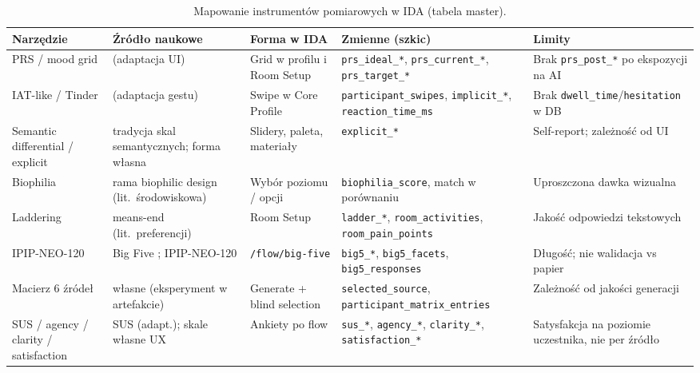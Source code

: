 \begin{table}[htbp]
  \centering
  \small
  \caption{Mapowanie instrumentów pomiarowych w IDA (tabela master).}
  \label{tab:ch06:instruments}
  \begin{tabular}{@{}p{2.2cm}p{2.6cm}p{3.0cm}p{2.8cm}p{2.8cm}@{}}
    \toprule
    Narzędzie & Źródło naukowe & Forma w IDA & Zmienne (szkic) & Limity \\
    \midrule
    PRS / mood grid &
      \textcite{hartig1997prs} (adaptacja UI) &
      Grid w profilu i Room Setup &
      \texttt{prs\_ideal\_*}, \texttt{prs\_current\_*}, \texttt{prs\_target\_*} &
      Brak \texttt{prs\_post\_*} po ekspozycji na AI \\
    \addlinespace
    IAT-like / Tinder &
      \textcite{greenwald1998iat} (adaptacja gestu) &
      Swipe w Core Profile &
      \texttt{participant\_swipes}, \texttt{implicit\_*}, \texttt{reaction\_time\_ms} &
      Brak \texttt{dwell\_time}/\texttt{hesitation} w DB \\
    \addlinespace
    Semantic differential / explicit &
      tradycja skal semantycznych; forma własna &
      Slidery, paleta, materiały &
      \texttt{explicit\_*} &
      Self-report; zależność od UI \\
    \addlinespace
    Biophilia &
      rama biophilic design (lit.\ środowiskowa) &
      Wybór poziomu / opcji &
      \texttt{biophilia\_score}, match w porównaniu &
      Uproszczona dawka wizualna \\
    \addlinespace
    Laddering &
      means-end (lit.\ preferencji) &
      Room Setup &
      \texttt{ladder\_*}, \texttt{room\_activities}, \texttt{room\_pain\_points} &
      Jakość odpowiedzi tekstowych \\
    \addlinespace
    IPIP-NEO-120 &
      Big Five \parencite{john2008bigfive}; IPIP-NEO-120 &
      \texttt{/flow/big-five} &
      \texttt{big5\_*}, \texttt{big5\_facets}, \texttt{big5\_responses} &
      Długość; nie walidacja vs papier \\
    \addlinespace
    Macierz 6 źródeł &
      własne (eksperyment w artefakcie) &
      Generate + blind selection &
      \texttt{selected\_source}, \texttt{participant\_matrix\_entries} &
      Zależność od jakości generacji \\
    \addlinespace
    SUS / agency / clarity / satisfaction &
      SUS (adapt.); skale własne UX &
      Ankiety po flow &
      \texttt{sus\_*}, \texttt{agency\_*}, \texttt{clarity\_*}, \texttt{satisfaction\_*} &
      Satysfakcja na poziomie uczestnika, nie per źródło \\
    \bottomrule
  \end{tabular}
\end{table}

